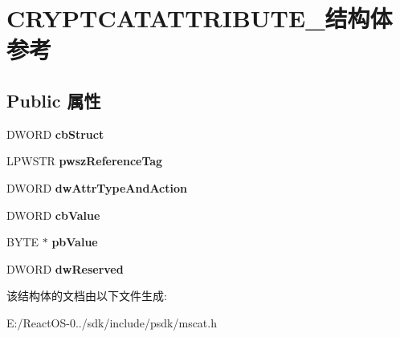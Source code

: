 \hypertarget{struct_c_r_y_p_t_c_a_t_a_t_t_r_i_b_u_t_e__}{}\section{C\+R\+Y\+P\+T\+C\+A\+T\+A\+T\+T\+R\+I\+B\+U\+T\+E\+\_\+结构体 参考}
\label{struct_c_r_y_p_t_c_a_t_a_t_t_r_i_b_u_t_e__}
\subsection*{Public 属性}
\begin{DoxyCompactItemize}
\item 
\mbox{\label{struct_c_r_y_p_t_c_a_t_a_t_t_r_i_b_u_t_e___a9545095a15cc58f47413757362a7786c}} 
D\+W\+O\+RD {\bfseries cb\+Struct}
\item 
\mbox{\label{struct_c_r_y_p_t_c_a_t_a_t_t_r_i_b_u_t_e___a0427062d995c3ced8c4c32ac2a1d8924}} 
L\+P\+W\+S\+TR {\bfseries pwsz\+Reference\+Tag}
\item 
\mbox{\label{struct_c_r_y_p_t_c_a_t_a_t_t_r_i_b_u_t_e___aec3985951584f6fc0d3e46aee3579590}} 
D\+W\+O\+RD {\bfseries dw\+Attr\+Type\+And\+Action}
\item 
\mbox{\label{struct_c_r_y_p_t_c_a_t_a_t_t_r_i_b_u_t_e___a7004d0fc9a75398840c3fc1da3a9688e}} 
D\+W\+O\+RD {\bfseries cb\+Value}
\item 
\mbox{\label{struct_c_r_y_p_t_c_a_t_a_t_t_r_i_b_u_t_e___a6651ec1d17f31608b59fbc86a84e2435}} 
B\+Y\+TE $\ast$ {\bfseries pb\+Value}
\item 
\mbox{\label{struct_c_r_y_p_t_c_a_t_a_t_t_r_i_b_u_t_e___aa00676b52757b99895798099ccdb5ec0}} 
D\+W\+O\+RD {\bfseries dw\+Reserved}
\end{DoxyCompactItemize}


该结构体的文档由以下文件生成\+:\begin{DoxyCompactItemize}
\item 
E\+:/\+React\+O\+S-\/0../sdk/include/psdk/mscat.\+h\end{DoxyCompactItemize}
